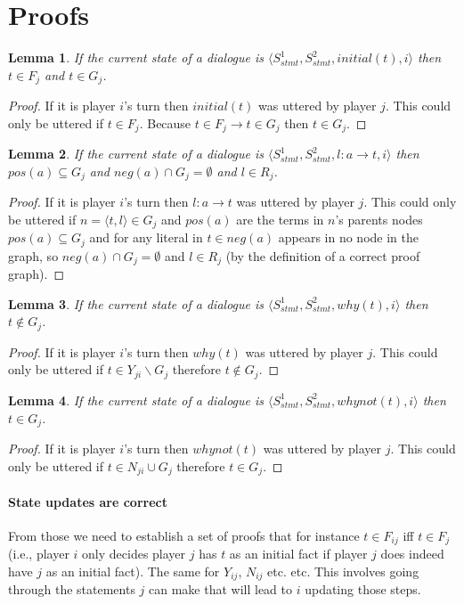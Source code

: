 \documentclass{blue-book}
\newtheorem{lemma}{Lemma}
\newcommand{\drule}[3]{\ensuremath{#1:#2 \rightarrow #3}}
\begin{document}
\section{Proofs}

\begin{lemma}
\label{lem:initial}
If the current state of a dialogue is $\langle S^1_{stmt}, S^2_{stmt}, initial(t), i \rangle$ then $t \in F_j$ and $t \in G_j$.
\end{lemma}
\begin{proof}
If it is player $i$'s turn then $initial(t)$ was uttered by player $j$.  This could only be uttered if $t \in F_j$.  Because $t \in F_j \rightarrow t \in G_j$  then $t \in G_j$.
\end{proof}
\begin{lemma}
\label{lem:drule}
If the current state of a dialogue is $\langle S^1_{stmt}, S^2_{stmt}, \drule{l}{a}{t}, i \rangle$ then $pos(a) \subseteq G_j$ and $neg(a) \cap G_j = \emptyset$ and $l \in R_j$.
\end{lemma}
\begin{proof}
If it is player $i$'s turn then $\drule{l}{a}{t}$ was uttered by player $j$.  This could only be uttered if $n = \langle t, l \rangle \in G_j$ and $pos(a)$ are the terms in $n$'s parents nodes $pos(a) \subseteq G_j$ and for any literal in $t \in neg(a)$ appears in no node in the graph, so $neg(a) \cap G_j = \emptyset$ and $l \in R_j$ (by the definition of a correct proof graph).
\end{proof}
\begin{lemma}
\label{lem:why}
If the current state of a dialogue is $\langle S^1_{stmt}, S^2_{stmt}, why(t), i \rangle$ then $t \not\in G_j$.
\end{lemma}
\begin{proof}
If it is player $i$'s turn then $why(t)$ was uttered by player $j$.  This could only be uttered if $t \in Y_{ji} \backslash G_j$ therefore $t \not\in G_j$.
\end{proof}
\begin{lemma}
\label{lem:whynot}
If the current state of a dialogue is $\langle S^1_{stmt}, S^2_{stmt}, whynot(t), i \rangle$ then $t \in G_j$.
\end{lemma}
\begin{proof}
If it is player $i$'s turn then $whynot(t)$ was uttered by player $j$.  This could only be uttered if $t \in N_{ji} \cup G_j$ therefore $t \in G_j$.
\end{proof}

\paragraph{State updates are correct} From those we need to establish a set of proofs that for instance $t \in F_{ij}$ iff $t \in F_j$ (i.e., player $i$ only decides player $j$ has $t$ as an initial fact if player $j$ does indeed have $j$ as an initial fact).  The same for $Y_{ij}$, $N_{ij}$ etc. etc.  This involves going through the statements $j$ can make that will lead to $i$ updating those steps.
\end{document}

